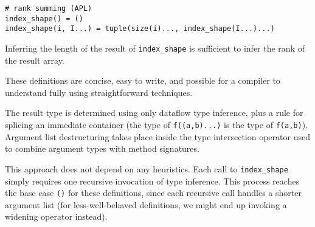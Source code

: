 \begin{verbatim}
# rank summing (APL)
index_shape() = ()
index_shape(i, I...) = tuple(size(i)..., index_shape(I...)...)
\end{verbatim}

Inferring the length of the result of \texttt{index\_shape} is sufficient
to infer the rank of the result array.

These definitions are concise, easy to write, and possible for a
compiler to understand fully using straightforward techniques.














The result type is determined using only dataflow type inference, plus a
rule for splicing an immediate container (the type of \texttt{f((a,b)...)} is
the type of \texttt{f(a,b)}). Argument list destructuring takes place inside
the type intersection operator used to combine argument types with method
signatures.

This approach does not depend on any heuristics. Each call to \texttt{index\_shape}
simply requires one recursive invocation of type inference. This process reaches
the base case \texttt{()} for these definitions, since each recursive call
handles a shorter argument list (for less-well-behaved definitions, we might
end up invoking a widening operator instead).


